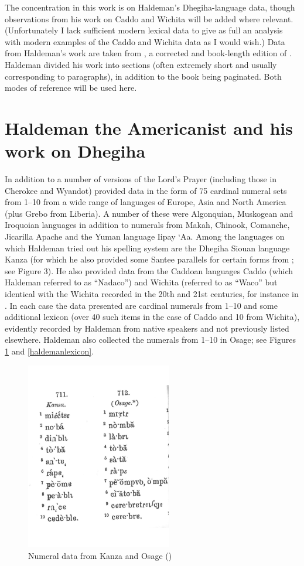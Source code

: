 \documentclass[output=paper]{LSP/langsci}
\begin{document}
The concentration in this work is on Haldeman's Dhegiha-language data, though observations from his work on Caddo and Wichita will be added where relevant. (Unfortunately I lack sufficient modern lexical data to give as full an analysis with modern examples of the Caddo and Wichita data as I would wish.)   Data from Haldeman's work are taken from \citet{Haldeman1860}, a corrected and book-length edition of \citet{Haldeman1859}.  Haldeman divided his work into sections (often extremely short and usually corresponding to paragraphs), in addition to the book being paginated.  Both modes of reference will be used here.  

\section{Haldeman the Americanist and his work on Dhegiha}  

In addition to a number of versions of the Lord's Prayer (including those in Cherokee and Wyandot) \citet{Haldeman1860}  provided data in the form of 75 cardinal numeral sets from 1--10 from a wide range of languages of Europe, Asia and North America (plus Grebo from Liberia).  A number of these were Algonquian, Muskogean and Iroquoian languages in addition to numerals from Makah, Chinook, Comanche, Jicarilla Apache and the Yuman language Iipay `Aa. Among the languages on which Haldeman tried out his spelling system are the Dhegiha Siouan language Kanza (for which he also provided some Santee parallels for certain forms from \citealt{Riggs1852}; see Figure 3).  He also provided data from the Caddoan languages Caddo (which Haldeman referred to as ``Nadaco'') and Wichita (referred to as ``Waco'' but identical with the Wichita recorded in the 20th and 21st centuries, for instance in \citet{Rood1975}. In each case the data presented are cardinal numerals from 1--10 and some additional lexicon (over 40 such items in the case of Caddo and 10 from Wichita), evidently recorded by Haldeman from native speakers and not previously listed elsewhere. Haldeman also collected the numerals from 1--10 in Osage; see Figures \ref{haldemannumerals} and \ref{haldemanlexicon}.   

\begin{figure}
\centering
\caption{Numeral data from Kanza and Osage (\citealt[3, \S711, 712]{Haldeman1860})} \label{haldemannumerals}
\includegraphics[width=2.5in,angle=-2]{figures/GrantNumerals}
\end{figure}
\end{document}
